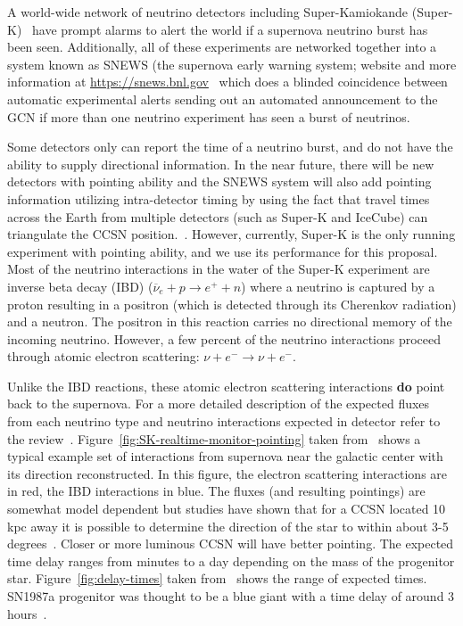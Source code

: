 \documentclass[12pt, letterpaper]{article}
\newcommand{\superk}  {Super\nobreakdash-K\xspace}
\begin{document}
A world-wide network of neutrino detectors including Super-Kamiokande
(\superk)~\cite{2003NIMPA.501..418F} have prompt alarms to alert the
world if a supernova neutrino burst has been seen.  Additionally, all
of these experiments are networked together into a system known as
SNEWS (the supernova early warning system; website and more
information at \url{https://snews.bnl.gov}~\cite{2004NJPh....6..114A}
which does a blinded coincidence between automatic experimental alerts
sending out an automated announcement to the GCN if more than one
neutrino experiment has seen a burst of neutrinos.

Some detectors only can report the time of a neutrino burst, and do
not have the ability to supply directional information.  In the near
future, there will be new detectors with pointing ability and the
SNEWS system will also add pointing information utilizing
intra-detector timing by using the fact that travel times across the
Earth from multiple detectors (such as \superk and IceCube) can
triangulate the CCSN position.~\cite{Katepaper}.  However, currently,
\superk is the only running experiment with pointing ability, and we
use its performance for this proposal. Most of the neutrino
interactions in the water of the \superk experiment are inverse beta
decay (IBD) ($ \overline{\nu}_{e}+ p \rightarrow e^{+} + n $) where a
neutrino is captured by a proton resulting in a positron (which is
detected through its Cherenkov radiation) and a neutron.  The positron
in this reaction carries no directional memory of the incoming
neutrino. However, a few percent of the neutrino interactions proceed
through atomic electron scattering:
$\nu + e^{-} \rightarrow \nu + e^{-} .$

Unlike the IBD reactions, these atomic electron scattering
interactions {\bf do} point back to the supernova.  For a more
detailed description of the expected fluxes from each neutrino type
and neutrino interactions expected in detector refer to the
review~\cite{2012ARNPS..62...81S}.
Figure~\ref{fig:SK-realtime-monitor-pointing} taken
from~\cite{2016APh....81...39A} shows a typical example set of
interactions from supernova near the galactic center with its
direction reconstructed.  In this figure, the electron scattering
interactions are in red, the IBD interactions in blue.  The fluxes
(and resulting pointings) are somewhat model dependent but studies
have shown that for a CCSN located 10 kpc away it is possible to
determine the direction of the star to within about 3-5
degrees~\cite{2016APh....81...39A}.  Closer or more luminous CCSN will
have better pointing.  The expected time delay ranges from minutes to
a day depending on the mass of the progenitor
star. Figure~\ref{fig:delay-times} taken
from~\cite{2013ApJ...778...81K} shows the range of expected times.
SN1987a progenitor was thought to be a blue giant with a time delay of
around 3 hours~\cite{ISAWTHISSOMWHERE}.
\end{document}
